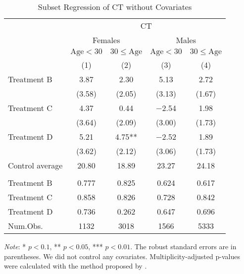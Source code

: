 \documentclass[12pt, a4paper]{article}
\begin{document}
\begin{table}[H]

\caption{\label{tab:test-lm-subset1}Subset Regression of CT without Covariates}
\centering
\fontsize{8}{10}\selectfont
\begin{threeparttable}
\begin{tabular}[t]{lcccc}
\toprule
\multicolumn{1}{c}{ } & \multicolumn{4}{c}{CT} \\
\cmidrule(l{3pt}r{3pt}){2-5}
\multicolumn{1}{c}{ } & \multicolumn{2}{c}{Females} & \multicolumn{2}{c}{Males} \\
\cmidrule(l{3pt}r{3pt}){2-3} \cmidrule(l{3pt}r{3pt}){4-5}
\multicolumn{1}{c}{ } & \multicolumn{1}{c}{$\text{Age} < 30$} & \multicolumn{1}{c}{$30 \le \text{Age}$} & \multicolumn{1}{c}{$\text{Age} < 30$} & \multicolumn{1}{c}{$30 \le \text{Age}$} \\
\cmidrule(l{3pt}r{3pt}){2-2} \cmidrule(l{3pt}r{3pt}){3-3} \cmidrule(l{3pt}r{3pt}){4-4} \cmidrule(l{3pt}r{3pt}){5-5}
  & (1) & (2) & (3) & (4)\\
\midrule
Treatment B & \num{3.87} & \num{2.30} & \num{5.13} & \num{2.72}\\
 & (\num{3.58}) & (\num{2.05}) & (\num{3.13}) & (\num{1.67})\\
Treatment C & \num{4.37} & \num{0.44} & \num{-2.54} & \num{1.98}\\
 & (\num{3.64}) & (\num{2.09}) & (\num{3.00}) & (\num{1.73})\\
Treatment D & \num{5.21} & \num{4.75}** & \num{-2.52} & \num{1.89}\\
 & (\num{3.62}) & (\num{2.12}) & (\num{3.06}) & (\num{1.73})\\
\midrule
Control average & 20.80 & 18.89 & 23.27 & 24.18\\
\addlinespace[0.3em]
\multicolumn{5}{l}{\textit{Multiplicity-adjusted p-values}}\\
\hspace{1em}Treatment B & 0.777 & 0.825 & 0.624 & 0.617\\
\hspace{1em}Treatment C & 0.858 & 0.826 & 0.728 & 0.842\\
\hspace{1em}Treatment D & 0.736 & 0.262 & 0.647 & 0.696\\
Num.Obs. & \num{1132} & \num{3018} & \num{1566} & \num{5333}\\
\bottomrule
\end{tabular}
\begin{tablenotes}
\item \emph{Note}: * $p < 0.1$, ** $p < 0.05$, *** $p < 0.01$. The robust standard errors are in parentheses. We did not control any covariates. Multiplicity-adjusted p-values were calculated with the method proposed by \cite{List2019}.
\end{tablenotes}
\end{threeparttable}
\end{table}
\end{document}
